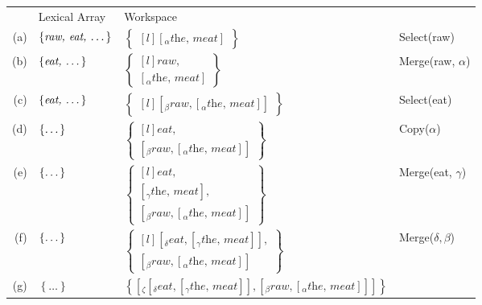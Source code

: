\documentclass[letterpaper,12pt]{article}
\begin{document}
  {\small
\begin{tabular}[t]{rlll}
  & Lexical Array & Workspace\\
  (a) & 
  $\left\{ \textit{raw, eat, \dots} \right\}$ &
  $
  \begin{Bmatrix*}[l]
   \left[_\alpha \textit{the, meat} \right] 
  \end{Bmatrix*}
  $
   &
  Select(raw)\\
  (b) &
  $\left\{ \textit{eat, \dots} \right\}$ &
  $\begin{Bmatrix*}[l]
    \textit{raw},\\
    \left[_\alpha\textit{the, meat}\right]
  \end{Bmatrix*}$ 
  &
  Merge(raw, $\alpha$)\\
  (c) &
  $\left\{  \textit{eat, \dots}\right\}$ &
  $
  \begin{Bmatrix*}[l]
    \left[_\beta \textit{raw}, \left[_\alpha\textit{the, meat}\right] \right]
  \end{Bmatrix*}
    $ &
  Select(eat)\\
  (d) &
  $\left\{ \textit{\dots} \right\}$ &
  $
  \begin{Bmatrix*}[l]
    \textit{eat},\\ 
    \left[_\beta \textit{raw}, \left[_\alpha\textit{the, meat}\right] \right]
  \end{Bmatrix*}
  $ &
  Copy($\alpha$)\\
  (e) &
  $\left\{ \textit{\dots} \right\}$ &
  $
  \begin{Bmatrix*}[l]
    \textit{eat},\\
    \left[_\gamma\textit{the, meat}\right],\\
    \left[_\beta \textit{raw}, \left[_\alpha\textit{the, meat}\right] \right]
  \end{Bmatrix*}
  $
    &
  Merge(eat,  $\gamma$)\\
  (f) &
  $\left\{ \textit{\dots} \right\}$ &
  $
  \begin{Bmatrix*}[l]
    \left[_\delta\textit{eat}, \left[_\gamma\textit{the, meat}\right]\right],\\
    \left[_\beta \textit{raw}, \left[_\alpha\textit{the, meat}\right] \right]
  \end{Bmatrix*}
  $ 
  &
  Merge($\delta, \beta$)\\
  (g) &
  $\left\{ \ldots \right\}$ &
  $\left\{  \left[ _\zeta \left[_\delta\textit{eat}, \left[_\gamma\textit{the, meat}\right]\right], \left[_\beta \textit{raw}, \left[_\alpha\textit{the, meat}\right] \right] \right]\right\}$ &
  \\
\end{tabular}}
\end{document}
